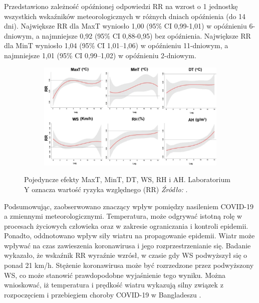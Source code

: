 \documentclass[polish, twoside, 12pt, a4paper]{article}
\theoremstyle{definition}
\theoremstyle{plain}
\theoremstyle{remark}
\begin{document}
Przedstawiono zależność opóźnionej odpowiedzi RR na wzrost o 1 jednostkę wszystkich wskaźników meteorologicznych w różnych dniach opóźnienia (do 14 dni). Największe RR dla MaxT wyniosło 1,00 (95\% CI 0,99-1,01) w opóźnieniu 6-dniowym, a najmniejsze 0,92 (95\% CI 0,88-0,95) bez opóźnienia. Największe RR dla MinT wyniosło 1,04 (95\% CI 1,01--1,06) w opóźnieniu 11-dniowym, a najmniejsze 1,01 (95\% CI 0,99--1,02) w opóźnieniu 2-dniowym. 


\begin{figure}[H]
  \centering

  \begin{subfigure}[t]{\textwidth}
    \includegraphics[width=15cm]{clmate-factors.jpg}
  \end{subfigure}

  \captionsetup{margin=10pt,font=small,labelfont=bf,width=.8\textwidth}

  \caption{Pojedyncze efekty MaxT, MinT, DT, WS, RH i AH. Laboratorium Y oznacza wartość ryzyka względnego (RR) \textit{Źródło:} \cite{hasanuzzaman2020}.}\label{fig:xxx3}
\end{figure}


Podsumowując, zaobserwowano znaczący wpływ pomiędzy nasileniem COVID-19 a zmiennymi meteorologicznymi. Temperatura, może odgrywać istotną rolę w procesach życiowych człowieka oraz w zakresie ograniczania i kontroli epidemii. Ponadto, oddnotowano wpływ siły wiatru na propagowanie epidemii. Wiatr może wpływać na czas zawieszenia koronawirusa i jego rozprzestrzenianie się. Badanie wykazało, że wskaźnik RR wyraźnie wzrósł, w czasie gdy WS podwyższył się o ponad 21 km/h. Stężenie koronawirusa może być rozrzedzone przez podwyższony WS, co może stanowić prawdopodobne wyjaśnienie tego wyniku. Można wnioskować, iż temperatura i prędkość wiatru wykazują silny związek z rozpoczęciem i przebiegiem choroby COVID-19 w Bangladeszu \cite{hasanuzzaman2020}.
\end{document}
